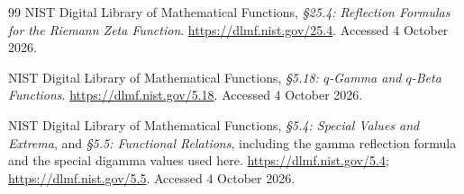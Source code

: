 \documentclass[11pt,a4paper]{article}
\numberwithin{equation}{section}
\theoremstyle{definition}
\theoremstyle{remark}\newtheorem{remark}[theorem]{Remark}
\begin{document}
\begin{thebibliography}{99}
NIST Digital Library of Mathematical Functions,
\emph{\S25.4: Reflection Formulas for the Riemann Zeta Function}.
\url{https://dlmf.nist.gov/25.4}. Accessed 4 October 2026.

NIST Digital Library of Mathematical Functions,
\emph{\S5.18: $q$-Gamma and $q$-Beta Functions}.
\url{https://dlmf.nist.gov/5.18}. Accessed 4 October 2026.

NIST Digital Library of Mathematical Functions,
\emph{\S5.4: Special Values and Extrema}, and
\emph{\S5.5: Functional Relations}, including the gamma reflection
formula and the special digamma values used here.
\url{https://dlmf.nist.gov/5.4}; \url{https://dlmf.nist.gov/5.5}.
Accessed 4 October 2026.

\end{thebibliography}
\end{document}
